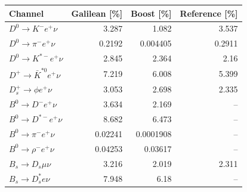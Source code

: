 \begin{tabular}{lrrr}
\toprule
Channel & Galilean [\%] & Boost [\%] & Reference [\%] \\
\midrule
$D^0\to K^-e^+\nu$ & 3.287 & 1.082 & 3.537 \\
$D^0\to\pi^-e^+\nu$ & 0.2192 & 0.004405 & 0.2911 \\
$D^0\to K^{*-}e^+\nu$ & 2.845 & 2.364 & 2.16 \\
$D^+\to\bar K^{*0}e^+\nu$ & 7.219 & 6.008 & 5.399 \\
$D_s^+\to\phi e^+\nu$ & 3.053 & 2.698 & 2.335 \\
$B^0\to D^-e^+\nu$ & 3.634 & 2.169 & -- \\
$B^0\to D^{*-}e^+\nu$ & 8.682 & 6.473 & -- \\
$B^0\to\pi^-e^+\nu$ & 0.02241 & 0.0001908 & -- \\
$B^0\to\rho^-e^+\nu$ & 0.04253 & 0.03617 & -- \\
$B_s\to D_s\mu\nu$ & 3.216 & 2.019 & 2.311 \\
$B_s\to D_s^*e\nu$ & 7.948 & 6.18 & -- \\
\bottomrule
\end{tabular}
